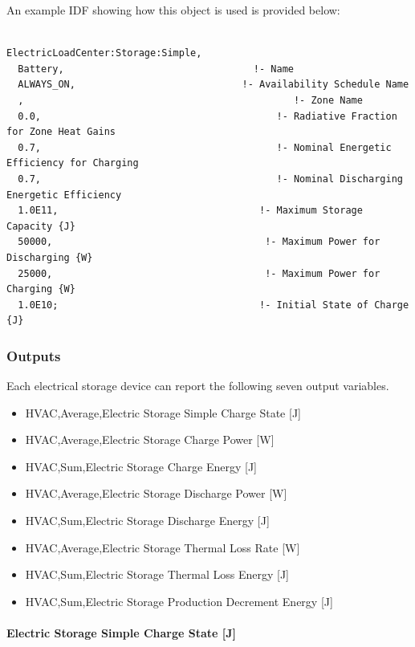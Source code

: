 An example IDF showing how this object is used is provided below:

\begin{lstlisting}

ElectricLoadCenter:Storage:Simple,
  Battery,                                 !- Name
  ALWAYS_ON,                             !- Availability Schedule Name
  ,                                               !- Zone Name
  0.0,                                         !- Radiative Fraction for Zone Heat Gains
  0.7,                                         !- Nominal Energetic Efficiency for Charging
  0.7,                                         !- Nominal Discharging Energetic Efficiency
  1.0E11,                                   !- Maximum Storage Capacity {J}
  50000,                                     !- Maximum Power for Discharging {W}
  25000,                                     !- Maximum Power for Charging {W}
  1.0E10;                                   !- Initial State of Charge {J}
\end{lstlisting}

\subsubsection{Outputs}\label{outputs-4-003}

Each electrical storage device can report the following seven output variables.

\begin{itemize}
\item
  HVAC,Average,Electric Storage Simple Charge State {[}J{]}
\item
  HVAC,Average,Electric Storage Charge Power {[}W{]}
\item
  HVAC,Sum,Electric Storage Charge Energy {[}J{]}
\item
  HVAC,Average,Electric Storage Discharge Power {[}W{]}
\item
  HVAC,Sum,Electric Storage Discharge Energy {[}J{]}
\item
  HVAC,Average,Electric Storage Thermal Loss Rate {[}W{]}
\item
  HVAC,Sum,Electric Storage Thermal Loss Energy {[}J{]}
\item
  HVAC,Sum,Electric Storage Production Decrement Energy {[}J{]}
\end{itemize}

\paragraph{Electric Storage Simple Charge State {[}J{]}}\label{electric-storage-simple-charge-state-j}

